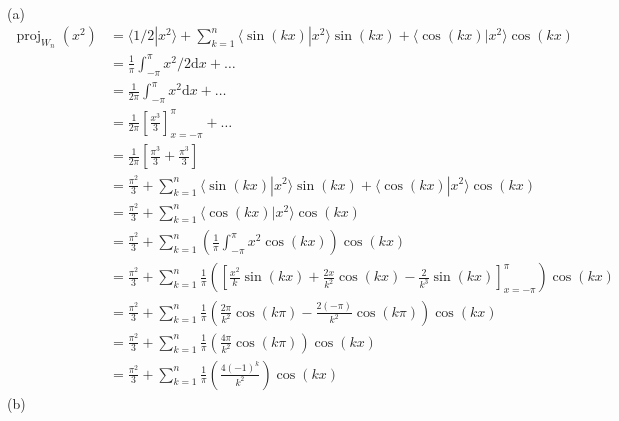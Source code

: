 \documentclass{report}
\begin{document}
\sol \\
(a)
$$
\begin{aligned}
\operatorname{proj}_{W_n}(x^2) &= \langle 1/2 | x^2 \rangle + \sum_{k=1}^n \langle \sin(kx) | x^2 \rangle\sin(kx) + \langle\cos(kx)|x^2\rangle\cos(kx)\\
&=\frac{1}{\pi}\int_{-\pi}^\pi x^2/2\mathrm{d}x + \ldots\\
&=\frac{1}{2\pi}\int_{-\pi}^\pi x^2\mathrm{d}x + \ldots\\
&=\frac{1}{2\pi}\left[\frac{x^3}{3}\right]_{x=-\pi}^\pi + \ldots\\
&=\frac{1}{2\pi}\left[\frac{\pi^3}{3}+\frac{\pi^3}{3}\right]\\
&=\frac{\pi^2}{3} + \sum_{k=1}^n \langle \sin(kx) | x^2 \rangle\sin(kx) + \langle\cos(kx)|x^2\rangle\cos(kx)\\
&=\frac{\pi^2}{3} + \sum_{k=1}^n \langle\cos(kx)|x^2\rangle\cos(kx)\\
&=\frac{\pi^2}{3} + \sum_{k=1}^n \left(\frac{1}{\pi}\int_{-\pi}^{\pi}x^2\cos(kx)\right)\cos(kx)\\
&=\frac{\pi^2}{3} + \sum_{k=1}^n \frac{1}{\pi}\left(\left[\frac{x^2}{k}\sin(kx)+\frac{2x}{k^2}\cos(kx)-\frac{2}{k^3}\sin(kx)\right]_{x=-\pi}^\pi\right)\cos(kx)\\
&=\frac{\pi^2}{3} + \sum_{k=1}^n \frac{1}{\pi}\left(\frac{2\pi}{k^2}\cos(k\pi)-\frac{2(-\pi)}{k^2}\cos(k\pi)\right)\cos(kx)\\
&=\frac{\pi^2}{3} + \sum_{k=1}^n \frac{1}{\pi}\left(\frac{4\pi}{k^2}\cos(k\pi)\right)\cos(kx)\\
&=\frac{\pi^2}{3} + \sum_{k=1}^n \frac{1}{\pi}\left(\frac{4(-1)^k}{k^2}\right)\cos(kx)
\end{aligned}
$$
(b)
$$
\begin{aligned}
\end{aligned}
$$
\end{document}
